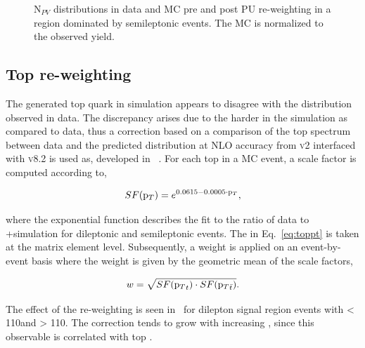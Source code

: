 \begin{figure}
  \caption{$\text{N}_{PV}$ distributions in data and MC pre and post PU re-weighting in a region dominated by semileptonic \ttbar events. The MC is normalized to the observed yield.}
  \label{fig:npv}
\end{figure}
 
\subsection{Top \pt re-weighting}
\label{subsec:toppt}
The generated top quark \pt in \ttbar simulation appears to disagree with the distribution observed in data. The discrepancy arises due to the harder \pt in the simulation as compared to data, thus a correction based on a comparison of the top \pt spectrum between data and the predicted distribution at NLO accuracy from \POWHEG \textsc{v2} interfaced with \Pythia \textsc{v8.2} is used as, developed in ~\cite{Khachatryan:2016mnb}. For each top in a \ttbar MC event, a scale factor is computed according to, 

\begin{equation}
  SF({\mathrm p_{T}}) = e^{0.0615 - 0.0005\cdot{\mathrm p_{T}}},
  \label{eq:toppt}
\end{equation}

where the exponential function describes the fit to the ratio of data to \POWHEG+\Pythia simulation for dileptonic and semileptonic \ttbar events. The \pt in Eq.~\ref{eq:toppt} is taken at the matrix element level. Subsequently, a weight is applied on an event-by-event basis where the weight is given by the geometric mean of the scale factors,

\begin{equation}
  w = \sqrt{SF({\mathrm p_{T}}_{t})\cdot SF({\mathrm p_{T}}_{\bar{t}})}.
\end{equation}

The effect of the re-weighting is seen in~ for dilepton signal region events with \mttll< 110\:\GeV\:and \mttll> 110\:\GeV. The correction tends to grow with increasing \ptmiss, since this observable is correlated with top \pt.

